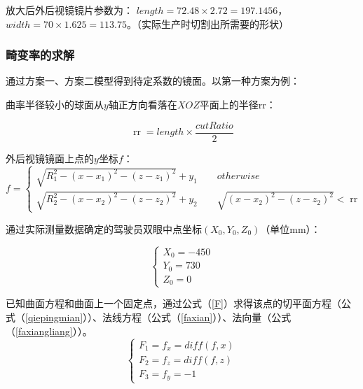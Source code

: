 \documentclass[withoutpreface,bwprint]{cumcmthesis} %
\begin{document}
\par 放大后外后视镜镜片参数为：
$length = 72.48\times 2.72 = 197.1456$，            
$width = 70 \times 1.625 = 113.75$。（实际生产时切割出所需要的形状）

\subsubsection{畸变率的求解}

\par 通过方案一、方案二模型得到待定系数的镜面。以第一种方案为例：
\par 曲率半径较小的球面从$y$轴正方向看落在$XOZ$平面上的半径rr：

\begin{equation}
	\mathop{rr} = length \times \frac{cutRatio}{2}
\end{equation}

\par 外后视镜镜面上点的$y$坐标$f$：
\begin{equation}
	f = 
	\begin{cases}
		\sqrt{R_1^2 - (x-x_1)^2 - (z - z_1)^2} + y_1\quad \quad otherwise
		\\
		\sqrt{R_2^2 - (x-x_2)^2 - (z - z_2)^2} + y_2 \quad \quad 
		\sqrt{(x-x_2)^2 - (z - z_2)^2} < \mathop{rr} 
	\end{cases} 
\end{equation}

\par 通过实际测量数据确定的驾驶员双眼中点坐标$(X_0,Y_0,Z_0)$（单位mm）：

\begin{equation}
	\begin{cases}
		X_0 = -450 \\ 
		Y_0 = 730 \\
		Z_0 = 0 
	\end{cases} 
\end{equation}
\par 已知曲面方程和曲面上一个固定点，通过公式（\ref{F}）求得该点的切平面方程（公式（\ref{qiepingmian}））、法线方程（公式（\ref{faxian}））、法向量（公式（\ref{faxiangliang}））。
\begin{equation}
\label{F}
	\begin{cases}
		F_1 = f_x = diff(f,x) \\
		F_2 = f_z = diff(f,z) \\
		F_3 = f_y = -1
	\end{cases}
\end{equation}
\end{document}
